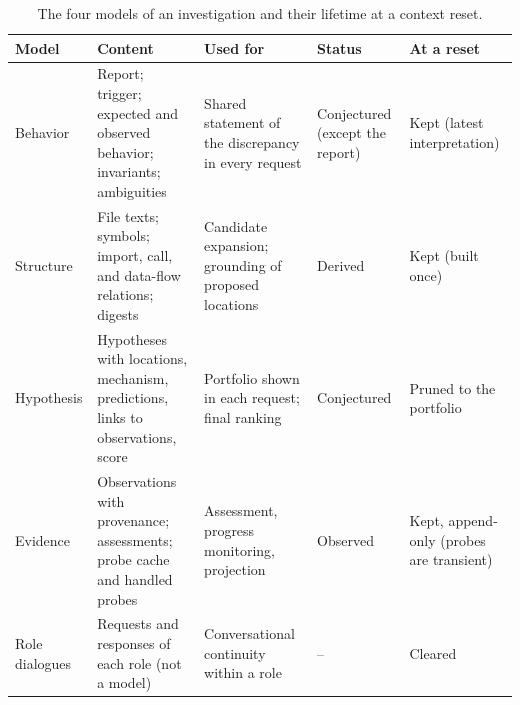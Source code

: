 \documentclass[letterpaper,journal]{IEEEtran}
\begin{document}
\begin{table}[t]
\caption{The four models of an investigation and their lifetime at a context reset.}\label{tab:models}
\centering\small\setlength{\tabcolsep}{3pt}
\renewcommand{\arraystretch}{1.12}
\begin{tabular}{@{}>{\raggedright\arraybackslash}p{}>{\raggedright\arraybackslash}p{}>{\raggedright\arraybackslash}p{}>{\raggedright\arraybackslash}p{}>{\raggedright\arraybackslash}p{}@{}}\toprule
Model & Content & Used for & Status & At a reset\\\midrule
Behavior & Report; trigger; expected and observed behavior; invariants; ambiguities & Shared statement of the discrepancy in every request & Conjectured (except the report) & Kept (latest interpretation)\\
Structure & File texts; symbols; import, call, and data-flow relations; digests & Candidate expansion; grounding of proposed locations & Derived & Kept (built once)\\
Hypothesis & Hypotheses with locations, mechanism, predictions, links to observations, score & Portfolio shown in each request; final ranking & Conjectured & Pruned to the portfolio\\
Evidence & Observations with provenance; assessments; probe cache and handled probes & Assessment, progress monitoring, projection & Observed & Kept, append-only (probes are transient)\\
\midrule
Role dialogues & Requests and responses of each role (not a model) & Conversational continuity within a role & -- & Cleared\\
\bottomrule\end{tabular}
\end{table}
\end{document}
